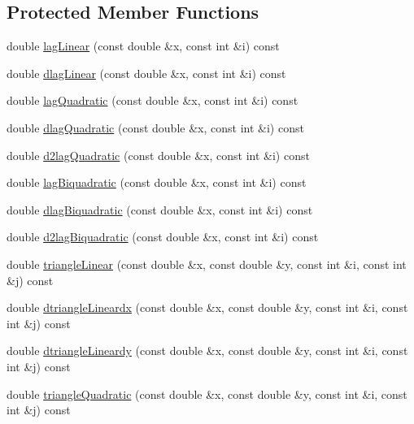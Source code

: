 \subsection*{Protected Member Functions}
\begin{DoxyCompactItemize}
\item 
double \mbox{\hyperlink{classfemus_1_1basis_a614b2d4abe684a504bb0f561d46397fa}{lag\+Linear}} (const double \&x, const int \&i) const
\item 
double \mbox{\hyperlink{classfemus_1_1basis_af771f9a5c71d06c873d474cf2bba3177}{dlag\+Linear}} (const double \&x, const int \&i) const
\item 
double \mbox{\hyperlink{classfemus_1_1basis_a49212826381f3ff3dad0bc61d6b6329c}{lag\+Quadratic}} (const double \&x, const int \&i) const
\item 
double \mbox{\hyperlink{classfemus_1_1basis_aba954c5565d837822ee4840f1ed77f33}{dlag\+Quadratic}} (const double \&x, const int \&i) const
\item 
double \mbox{\hyperlink{classfemus_1_1basis_a1c4544031232a6ae1cb0f8501d650758}{d2lag\+Quadratic}} (const double \&x, const int \&i) const
\item 
double \mbox{\hyperlink{classfemus_1_1basis_a2571f53dfeae70eccf63033736098d07}{lag\+Biquadratic}} (const double \&x, const int \&i) const
\item 
double \mbox{\hyperlink{classfemus_1_1basis_a52c019c4c820beb94e20e71b31868384}{dlag\+Biquadratic}} (const double \&x, const int \&i) const
\item 
double \mbox{\hyperlink{classfemus_1_1basis_a52634884baf22e8f65808ee0eca3e9b8}{d2lag\+Biquadratic}} (const double \&x, const int \&i) const
\item 
double \mbox{\hyperlink{classfemus_1_1basis_ae1b0f968c69a125b1437c86691b79659}{triangle\+Linear}} (const double \&x, const double \&y, const int \&i, const int \&j) const
\item 
double \mbox{\hyperlink{classfemus_1_1basis_a3393b4ce51e0c786e962220ffb2e7a26}{dtriangle\+Lineardx}} (const double \&x, const double \&y, const int \&i, const int \&j) const
\item 
double \mbox{\hyperlink{classfemus_1_1basis_ae05b1d5b6d73182b91aa079f864096ac}{dtriangle\+Lineardy}} (const double \&x, const double \&y, const int \&i, const int \&j) const
\item 
double \mbox{\hyperlink{classfemus_1_1basis_ae42b607d5f23bdf072243ee3db496a44}{triangle\+Quadratic}} (const double \&x, const double \&y, const int \&i, const int \&j) const

\end{DoxyCompactItemize}
